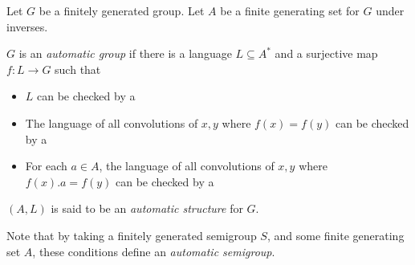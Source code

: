 \documentclass[12pt]{article}
\begin{document}
Let $G$ be a finitely generated group.  Let $A$ be a finite generating set for $G$  under inverses.

$G$ is an \emph{automatic group} if there is a language $L\subseteq A^*$ and a surjective map $f:L\rightarrow G$ such that
\begin{itemize}
\item $L$ can be checked by a 
\item The language of all convolutions of $x,y$ where $f(x)=f(y)$ can be checked by a 
\item For each $a\in A$, the language of all convolutions of $x,y$ where $f(x).a=f(y)$ can be checked by a 
\end{itemize}

$(A, L)$ is said to be an \emph{automatic structure} for $G$.

Note that by taking a finitely generated semigroup $S$, and some finite generating set $A$, these conditions define an \emph{automatic semigroup}.
\end{document}
